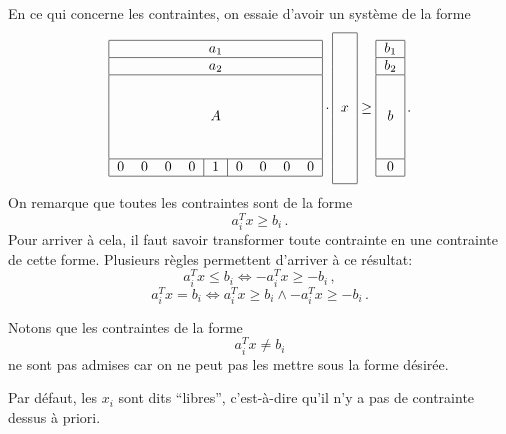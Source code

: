 	En ce qui concerne les contraintes,
	on essaie d'avoir un système de la forme
	\[
	\begin{tabular}{|ccccccccc|}
		\hline
		\multicolumn{9}{|c|}{$a_1$} \\
		\hline
		\multicolumn{9}{|c|}{$a_2$} \\
		\hline
		\multicolumn{9}{|c|}{\multirow{5}{*}{$A$}}
		\\
		&&&&&&&&\\
		&&&&&&&&\\
		&&&&&&&&\\
		&&&&&&&&\\
		\hline
		0 & 0 & 0 & 0 & \multicolumn{1}{|c|}{1} & 0 & 0 & 0 & 0 \\
		\hline
	\end{tabular}
	\cdot
	\begin{tabular}{|c|}
		\hline
		\multirow{9}{*}{$x$}
		\\
		\\
		\\
		\\
		\\
		\\
		\\
		\\
		\\
		\hline
	\end{tabular}
	\ge
	\begin{tabular}{|c|}
		\hline
		$b_1$ \\
		\hline
		$b_2$ \\
		\hline
		\multirow{5}{*}{$b$}
		\\
		\\
		\\
		\\
		\\
		\hline
		0 \\
		\hline
	\end{tabular}\,.
	\]
	On remarque que toutes les contraintes sont de la forme
	\[
	a_i^T x \ge b_i\,.
	\]
	Pour arriver à cela,
	il faut savoir transformer toute contrainte
	en une contrainte de cette forme.
	Plusieurs règles permettent d'arriver à ce résultat:
	\[
	a_i^T x \le b_i \iff -a_i^T x \ge -b_i\,,
	\]
	\[
	a_i^T x = b_i \iff a_i^T x \ge b_i \land -a_i^T x \ge -b_i\,.
	\]

	Notons que les contraintes de la forme
	\[
	a_i^T x \ne b_i
	\]
	ne sont pas admises car on ne peut pas les mettre sous la forme désirée.

	Par défaut, les $x_i$ sont dits ``libres'',
	c'est-à-dire qu'il n'y a pas de contrainte dessus à priori.


